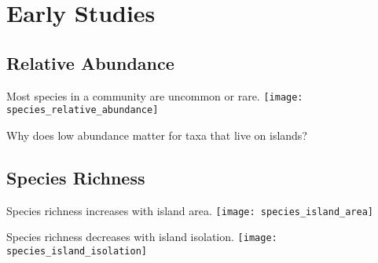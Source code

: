 \documentclass[xcolor=svgnames]{beamer}
\begin{document}
\section{Early Studies}

\subsection{Relative Abundance}

\begin{frame}{Most species in a community are uncommon or rare.}
	\centering
		\texttt{[image: species\_relative\_abundance]}\\
	\pause
	\begin{block}{}
		\centering 
		Why does low abundance matter for taxa that live on islands?
	\end{block}
\end{frame}

\subsection{Species Richness}

\begin{frame}{Species richness increases with island area.}
	\centering
		\texttt{[image: species\_island\_area]}
\end{frame}

\begin{frame}{Species richness decreases with island isolation.}
	\centering
		\texttt{[image: species\_island\_isolation]} \par
\end{frame}

\end{document}
